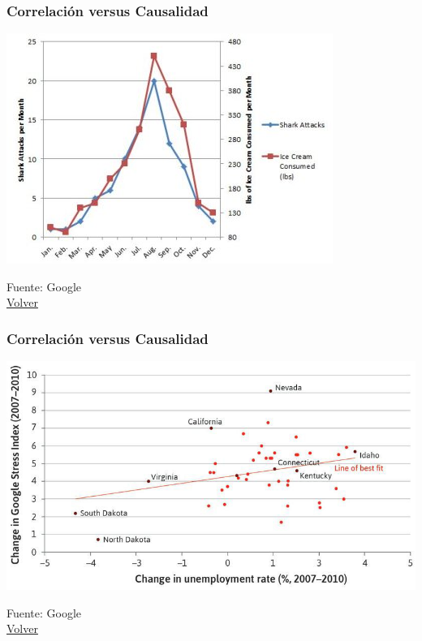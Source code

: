 \documentclass{beamer}
\begin{document}
\begin{frame} \label{htres}
\frametitle{Correlación versus Causalidad}
\begin{center}
    \includegraphics[scale=0.55]{Slides Principios de Economia/Figures/Introduccion_1.5_ovbias.jpg}
\end{center}
Fuente: Google \\
\hyperlink{uno}{Volver} 
\end{frame}

\begin{frame} \label{hcuatro}
\frametitle{Correlación versus Causalidad}
\begin{center}
    \includegraphics[scale=0.35]{Slides Principios de Economia/Figures/Introduccion_1.3_desempleoestres.jpg}
\end{center}
Fuente: Google \\
\hyperlink{uno}{Volver} 
\end{frame}
\end{document}
